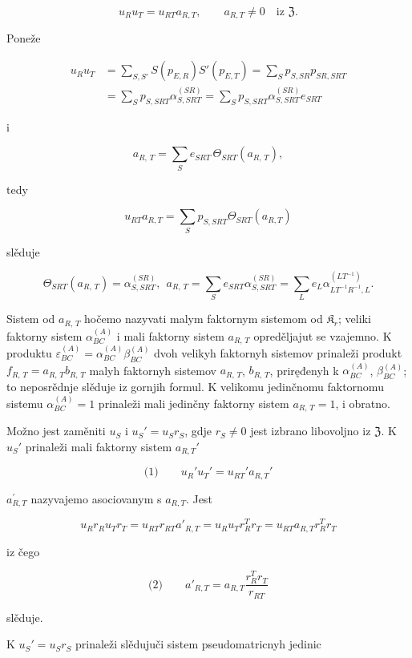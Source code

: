 \documentclass[11pt]{article}
\begin{document}
\[
u_Ru_T=u_{RT}a_{R,T},\qquad a_{R,T}\ne0\quad\text{iz }\mathfrak Z.
\]

Poneže

\[
\begin{aligned}
u_Ru_T
&=\sum_{S,S'} S(p_{E,R})S'(p_{E,T})
=\sum_S p_{S,SR}p_{SR,SRT}\\
&=\sum_S p_{S,SRT}\alpha_{S,SRT}^{(SR)}
=\sum_S p_{S,SRT}\alpha_{S,SRT}^{(SR)}e_{SRT}
\end{aligned}
\]

i

\[a_{R,\,T} = \sum\limits_{S} e_{SRT}\, \Theta_{SRT} \left(a_{R,\,T}\right),\]

tedy

\[u_{RT} a_{R,T} = \sum\limits_{S} p_{S,SRT} \Theta_{SRT} (a_{R,T})\]

slěduje

\[\Theta_{SRT}(a_{R,\,T}) = \alpha_{S,SRT}^{(SR)}, ~~ a_{R,\,T} = \sum\limits_{S} e_{SRT} \alpha_{S,SRT}^{(SR)} = \sum\limits_{L} e_{L} \alpha_{LT^{-1}R^{-1},L}^{(LT^{-1})}.\]

Sistem od \(a_{R,\,T}\) hočemo nazyvati malym faktornym sistemom od \(\mathfrak K_r\); veliki faktorny sistem \(\alpha_{BC}^{(A)}\) i mali faktorny sistem \(a_{R,\,T}\) opreděljajut se vzajemno. K produktu \(\varepsilon_{BC}^{(A)} = \alpha_{BC}^{(A)} \beta_{BC}^{(A)}\) dvoh velikyh faktornyh sistemov prinaleži produkt \(f_{R,\,T} = a_{R,\,T}b_{R,\,T}\) malyh faktornyh sistemov \(a_{R,\,T}\), \(b_{R,\,T}\), priręđenyh k \(\alpha_{BC}^{(A)}\), \(\beta_{BC}^{(A)}\); to neposrědnje slěduje iz gornjih formul. K velikomu jedinčnomu faktornomu sistemu \(\alpha_{BC}^{(A)} = 1\) prinaleži mali jedinčny faktorny sistem \(a_{R,\,T} = 1\), i obratno.

Možno jest zaměniti \(u_S\) i \(u_S'=u_Sr_S\), gdje \(r_S\neq 0\) jest izbrano libovoljno iz \(\mathfrak Z\). K \(u_S'\) prinaleži mali faktorny sistem \(a_{R,T}'\)

\[
\text{(1)}\qquad u_R'u_T'=u_{RT}'a_{R,T}'
\]

\(a_{R,T}^{\prime}\) nazyvajemo asociovanym s \(a_{R,T}\). Jest

\[u_R r_R u_T r_T = u_{RT} r_{RT} a'_{R,T} = u_R u_T r_R^T r_T = u_{RT} a_{R,T} r_R^T r_T\]

iz čego

\[
\text{(2)}\qquad a'_{R,T}=a_{R,T}\frac{r_R^T r_T}{r_{RT}}
\]

slěduje.

K \(u_S' = u_S r_S\) prinaleži slědujuči sistem pseudomatricnyh jedinic
\end{document}

